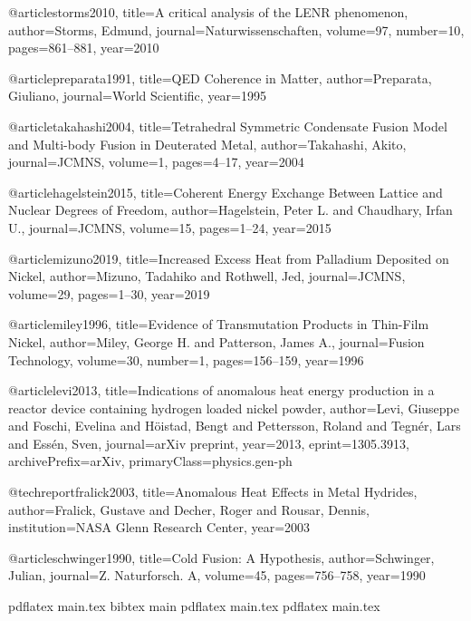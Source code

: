     @article{storms2010,
      title={A critical analysis of the LENR phenomenon},
      author={Storms, Edmund},
      journal={Naturwissenschaften},
      volume={97},
      number={10},
      pages={861--881},
      year={2010}
    }
    
    @article{preparata1991,
      title={QED Coherence in Matter},
      author={Preparata, Giuliano},
      journal={World Scientific},
      year={1995}
    }
    
    @article{takahashi2004,
      title={Tetrahedral Symmetric Condensate Fusion Model and Multi-body Fusion in Deuterated Metal},
      author={Takahashi, Akito},
      journal={JCMNS},
      volume={1},
      pages={4--17},
      year={2004}
    }
    
    @article{hagelstein2015,
      title={Coherent Energy Exchange Between Lattice and Nuclear Degrees of Freedom},
      author={Hagelstein, Peter L. and Chaudhary, Irfan U.},
      journal={JCMNS},
      volume={15},
      pages={1--24},
      year={2015}
    }
    
    @article{mizuno2019,
      title={Increased Excess Heat from Palladium Deposited on Nickel},
      author={Mizuno, Tadahiko and Rothwell, Jed},
      journal={JCMNS},
      volume={29},
      pages={1--30},
      year={2019}
    }
    
    @article{miley1996,
      title={Evidence of Transmutation Products in Thin-Film Nickel},
      author={Miley, George H. and Patterson, James A.},
      journal={Fusion Technology},
      volume={30},
      number={1},
      pages={156--159},
      year={1996}
    }
    
    @article{levi2013,
      title={Indications of anomalous heat energy production in a reactor device containing hydrogen loaded nickel powder},
      author={Levi, Giuseppe and Foschi, Evelina and Höistad, Bengt and Pettersson, Roland and Tegnér, Lars and Essén, Sven},
      journal={arXiv preprint},
      year={2013},
      eprint={1305.3913},
      archivePrefix={arXiv},
      primaryClass={physics.gen-ph}
    }
    
    @techreport{fralick2003,
      title={Anomalous Heat Effects in Metal Hydrides},
      author={Fralick, Gustave and Decher, Roger and Rousar, Dennis},
      institution={NASA Glenn Research Center},
      year={2003}
    }
    
    @article{schwinger1990,
      title={Cold Fusion: A Hypothesis},
      author={Schwinger, Julian},
      journal={Z. Naturforsch. A},
      volume={45},
      pages={756--758},
      year={1990}
    }
    
    
    pdflatex main.tex
    bibtex main
    pdflatex main.tex
    pdflatex main.tex
    